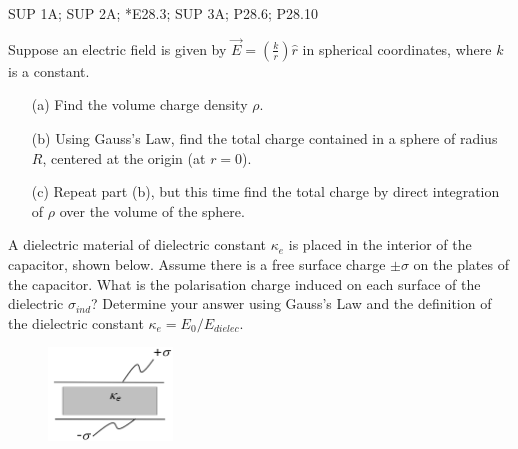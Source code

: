 \documentclass[11pt,letterpaper,boxed]{pset}
\begin{document}
    \begin{center}
    	  SUP 1A; SUP 2A; *E28.3; SUP 3A; P28.6; P28.10

    \end{center}
    
    \begin{problem} [SUP 1A]
    Suppose an electric field is given by $\Vec{E}=(\frac{k}{r})\hat{r}$ in spherical coordinates, where $k$ is a constant.
    
    \begin{itemize}
        \item [(a)] Find the volume charge density $\rho$.
        \item [(b)] Using Gauss's Law, find the total charge contained in a sphere of radius $R$, centered at the origin (at $r=0$).
        \item [(c)] Repeat part (b), but this time find the total charge by direct integration of $\rho$ over the volume of the sphere.
    \end{itemize}
    \end{problem}
    \newpage
    
    \begin{problem} [SUP 2A]
    A dielectric material of dielectric constant $\kappa_e$ is placed in the interior of the capacitor, shown below. Assume there is a free surface charge $\pm\sigma$ on the plates of the capacitor. What is the polarisation charge induced on each surface of the dielectric $\sigma_{ind}$? Determine your answer using Gauss's Law and the definition of the dielectric constant $\kappa_e=E_0/E_{dielec}$.
    \end{problem}
    \begin{figure} [ht]
        \includegraphics[width=125px]{HW3Images/SUP2A.png}
        \label{fig:P27-4}
    \end{figure}
    \newpage
    
\end{document}
